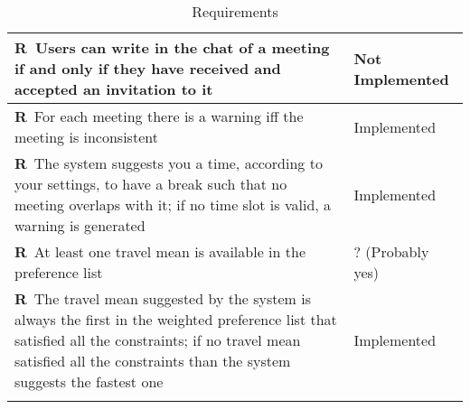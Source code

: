 \begin{longtable}{|m{7cm}|m{7cm}|}
	\textbf{R\reqNum}~Users can write in the chat of a meeting if and only if they have received and accepted an invitation to it & Not Implemented	\\ \hline
	\textbf{R\reqNum}~For each meeting there is a warning iff the meeting is inconsistent & Implemented \\ \hline
	\textbf{R\reqNum}~The system suggests you a time, according to your settings, to have a break such that no meeting overlaps with it; if no time slot is valid, a warning is generated & Implemented \\ \hline
	\textbf{R\reqNum}~At least one travel mean is available in the preference list & ? (Probably yes) \\ \hline
	\textbf{R\reqNum}~The travel mean suggested by the system is always the first in the weighted preference list that satisfied all the constraints; if no travel mean satisfied all the constraints than the system suggests the fastest one & Implemented \\ \hline
	\caption{Requirements}
\end{longtable}
